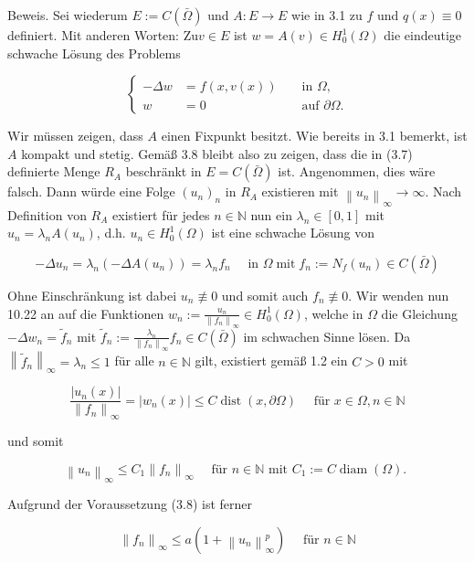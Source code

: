 \documentclass[10pt, letterpaper]{article}
\begin{document}
Beweis. Sei wiederum $E:=C(\bar{\Omega})$ und $A: E \rightarrow E$ wie in 3.1 zu $f$ und $q(x) \equiv 0$ definiert. Mit anderen Worten: $\mathrm{Zu} v \in E$ ist $w=A(v) \in H_{0}^{1}(\Omega)$ die eindeutige schwache Lösung des Problems

$$
\left\{\begin{aligned}
-\Delta w & =f(x, v(x)) & & \text { in } \Omega, \\
w & =0 & & \text { auf } \partial \Omega .
\end{aligned}\right.
$$

Wir müssen zeigen, dass $A$ einen Fixpunkt besitzt. Wie bereits in 3.1 bemerkt, ist $A$ kompakt und stetig. Gemäß 3.8 bleibt also zu zeigen, dass die in (3.7) definierte Menge $R_{A}$ beschränkt in $E=C(\bar{\Omega})$ ist. Angenommen, dies wäre falsch. Dann würde eine Folge $\left(u_{n}\right)_{n}$ in $R_{A}$ existieren mit $\left\|u_{n}\right\|_{\infty} \rightarrow \infty$. Nach Definition von $R_{A}$ existiert für jedes $n \in \mathbb{N}$ nun ein $\lambda_{n} \in[0,1]$ mit $u_{n}=\lambda_{n} A\left(u_{n}\right)$, d.h. $u_{n} \in H_{0}^{1}(\Omega)$ ist eine schwache Lösung von

$$
-\Delta u_{n}=\lambda_{n}\left(-\Delta A\left(u_{n}\right)\right)=\lambda_{n} f_{n} \quad \text { in } \Omega \operatorname{mit} f_{n}:=N_{f}\left(u_{n}\right) \in C(\bar{\Omega})
$$

Ohne Einschränkung ist dabei $u_{n} \not \equiv 0$ und somit auch $f_{n} \not \equiv 0$. Wir wenden nun 10.22 an auf die Funktionen $w_{n}:=\frac{u_{n}}{\left\|f_{n}\right\|_{\infty}} \in H_{0}^{1}(\Omega)$, welche in $\Omega$ die Gleichung $-\Delta w_{n}=\tilde{f}_{n}$ mit $\tilde{f}_{n}:=\frac{\lambda_{n}}{\left\|f_{n}\right\|_{\infty}} f_{n} \in C(\bar{\Omega})$ im schwachen Sinne lösen. Da $\left\|\tilde{f}_{n}\right\|_{\infty}=\lambda_{n} \leq 1$ für alle $n \in \mathbb{N}$ gilt, existiert gemäß 1.2 ein $C>0$ mit

$$
\frac{\left|u_{n}(x)\right|}{\left\|f_{n}\right\|_{\infty}}=\left|w_{n}(x)\right| \leq C \operatorname{dist}(x, \partial \Omega) \quad \text { für } x \in \Omega, n \in \mathbb{N}
$$

und somit

$$
\left\|u_{n}\right\|_{\infty} \leq C_{1}\left\|f_{n}\right\|_{\infty} \quad \text { für } n \in \mathbb{N} \text { mit } C_{1}:=C \operatorname{diam}(\Omega) \text {. }
$$

Aufgrund der Voraussetzung (3.8) ist ferner

$$
\left\|f_{n}\right\|_{\infty} \leq a\left(1+\left\|u_{n}\right\|_{\infty}^{p}\right) \quad \text { für } n \in \mathbb{N}
$$
\end{document}
